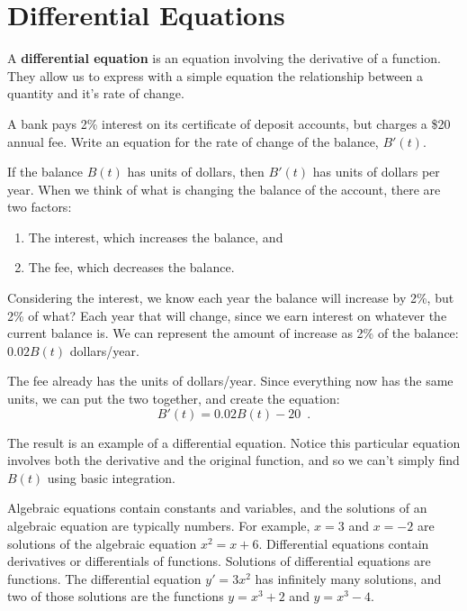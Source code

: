 \section{Differential Equations}
\label{sec:diff-eqs}

A {\bf differential equation} is an equation involving the derivative of a function. They allow us to express with a simple equation the relationship between a quantity and it's rate of change.

\begin{example}
A bank pays 2\% interest on its certificate of deposit accounts, but charges a \$20 annual fee. Write an equation for the rate of change of the balance, $B'(t)$.

\begin{solution}
  If the balance $B(t)$ has units of dollars, then $B'(t)$ has units of dollars per year. When we think of what is changing the balance of the account, there are two factors:
\begin{enumerate}
  \item The interest, which increases the balance, and
  \item The fee, which decreases the balance.
\end{enumerate}
Considering the interest, we know each year the balance will increase by 2\%, but 2\% of what? Each year that will change, since we earn interest on whatever the current balance is. We can represent the amount of increase as 2\% of the balance: $0.02B(t)$ dollars/year.

The fee already has the units of dollars/year. Since everything now has the same units, we can put the two together, and create the equation:
$$B'(t)=0.02B(t)-20 \enspace .$$
\end{solution}\end{example}

The result is an example of a differential equation. Notice this particular equation involves both the derivative and the original function, and so we can't simply find $B(t)$ using basic integration.

Algebraic equations contain constants and variables, and the solutions of an algebraic equation are typically numbers. For example, $x=3$ and $x=-2$ are solutions of the algebraic equation $x^2=x+6$. Differential equations contain derivatives or differentials of functions. Solutions of differential equations are functions. The differential equation $y'=3x^2$ has infinitely many solutions, and two of those solutions are the functions $y=x^3+2$ and $y=x^3-4$.

